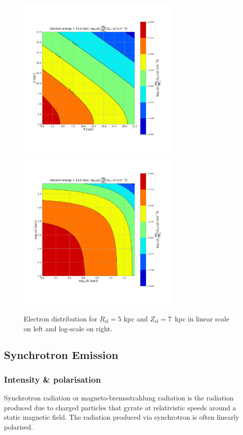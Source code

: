 \documentclass[12pt, a4 paper]{mnras}
\begin{document}
\begin{figure}
    \centering
    \includegraphics[width= 8cm]{Images/Linear_EdNdE.png}%
    \includegraphics[width = 8cm]{Images/Log_EdNdE.png}
    \caption{Electron distribution for $R_{\mathrm{el}} = 5$ kpc and $Z_{\mathrm{el}} = 7$~kpc in linear scale on left and log-scale on right.}
    \label{fig:my_label}
\end{figure}

\subsection{Synchrotron Emission}\label{Synchrotron_theory}

\subsubsection{Intensity \& polarisation}
Synchrotron radiation or magneto-bremsstrahlung radiation is the radiation produced due to charged particles that gyrate at relativistic speeds around a static magnetic field. The radiation produced via synchrotron is often linearly polarised.
\end{document}
